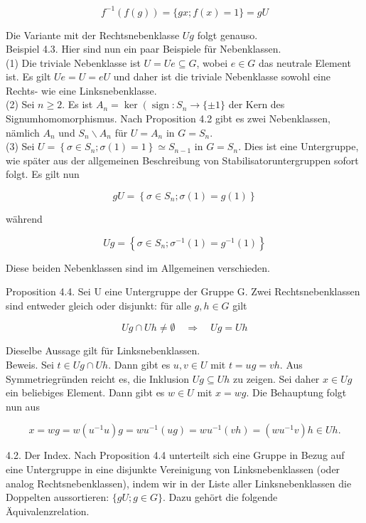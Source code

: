 \documentclass[10pt, letterpaper]{article}
\begin{document}
$$
f^{-1}(f(g))=\{g x ; f(x)=1\}=g U
$$

Die Variante mit der Rechtsnebenklasse $U g$ folgt genauso.\\
Beispiel 4.3. Hier sind nun ein paar Beispiele für Nebenklassen.\\
(1) Die triviale Nebenklasse ist $U=U e \subseteq G$, wobei $e \in G$ das neutrale Element ist. Es gilt $U e=U=e U$ und daher ist die triviale Nebenklasse sowohl eine Rechts- wie eine Linksnebenklasse.\\
(2) Sei $n \geq 2$. Es ist $A_{n}=\operatorname{ker}\left(\operatorname{sign}: S_{n} \rightarrow\{ \pm 1\}\right.$ der Kern des Signumhomomorphismus. Nach Proposition 4.2 gibt es zwei Nebenklassen, nämlich $A_{n}$ und $S_{n} \backslash A_{n}$ für $U=A_{n}$ in $G=S_{n}$.\\
(3) Sei $U=\left\{\sigma \in S_{n} ; \sigma(1)=1\right\} \simeq S_{n-1}$ in $G=S_{n}$. Dies ist eine Untergruppe, wie später aus der allgemeinen Beschreibung von Stabilisatoruntergruppen sofort folgt. Es gilt nun

$$
g U=\left\{\sigma \in S_{n} ; \sigma(1)=g(1)\right\}
$$

während

$$
U g=\left\{\sigma \in S_{n} ; \sigma^{-1}(1)=g^{-1}(1)\right\}
$$

Diese beiden Nebenklassen sind im Allgemeinen verschieden.

Proposition 4.4. Sei U eine Untergruppe der Gruppe G. Zwei Rechtsnebenklassen sind entweder gleich oder disjunkt: für alle $g, h \in G$ gilt

$$
U g \cap U h \neq \emptyset \quad \Longrightarrow \quad U g=U h
$$

Dieselbe Aussage gilt für Linksnebenklassen.\\
Beweis. Sei $t \in U g \cap U h$. Dann gibt es $u, v \in U$ mit $t=u g=v h$. Aus Symmetriegründen reicht es, die Inklusion $U g \subseteq U h$ zu zeigen. Sei daher $x \in U g$ ein beliebiges Element. Dann gibt es $w \in U$ mit $x=w g$. Die Behauptung folgt nun aus

$$
x=w g=w\left(u^{-1} u\right) g=w u^{-1}(u g)=w u^{-1}(v h)=\left(w u^{-1} v\right) h \in U h .
$$

4.2. Der Index. Nach Proposition 4.4 unterteilt sich eine Gruppe in Bezug auf eine Untergruppe in eine disjunkte Vereinigung von Linksnebenklassen (oder analog Rechtsnebenklassen), indem wir in der Liste aller Linksnebenklassen die Doppelten aussortieren: $\{g U ; g \in G\}$. Dazu gehört die folgende Äquivalenzrelation.
\end{document}
